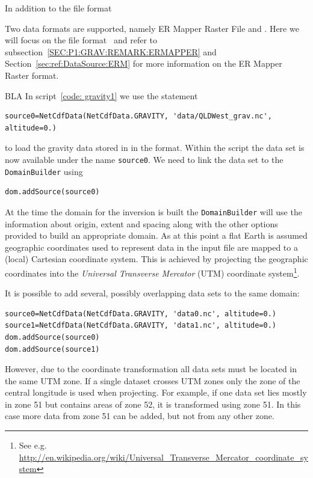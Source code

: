 
In addition to the \netcdf file format 


Two data formats are supported, namely ER Mapper Raster File and \netcdf.
Here we will focus on the \netcdf file format~\cite{NETCDF} and refer to
subsection~\ref{SEC:P1:GRAV:REMARK:ERMAPPER} and
Section~\ref{sec:ref:DataSource:ERM} for more information on the ER Mapper
Raster format.

BLA
In script~\ref{code: gravity1} we use the statement 
\begin{verbatim}
source0=NetCdfData(NetCdfData.GRAVITY, 'data/QLDWest_grav.nc', altitude=0.)
\end{verbatim}
  
to load the gravity data stored in  in the \netcdf format. 
Within the script the data set is now available under the name \verb|source0|.
We need to link the data set to the \verb|DomainBuilder| using 
\begin{verbatim}
dom.addSource(source0)
\end{verbatim}
At the time the domain for the inversion is built the \verb|DomainBuilder|
will use the information about origin, extent and spacing along with the other
options provided to build an appropriate domain.
As at this point a flat Earth is assumed geographic coordinates used to
represent data in the input file are mapped to a (local) Cartesian coordinate
system. This is achieved by projecting the geographic coordinates into the
\emph{Universal Transverse Mercator} (UTM) coordinate system\footnote{See e.g.
\url{http://en.wikipedia.org/wiki/Universal_Transverse_Mercator_coordinate_system}}.

It is possible to add several, possibly overlapping data sets to the same
domain:
\begin{verbatim}
source0=NetCdfData(NetCdfData.GRAVITY, 'data0.nc', altitude=0.)
source1=NetCdfData(NetCdfData.GRAVITY, 'data1.nc', altitude=0.)
dom.addSource(source0)
dom.addSource(source1)
\end{verbatim}
However, due to the coordinate transformation all data sets must be located in
the same UTM zone. If a single dataset crosses UTM zones only the zone of the
central longitude is used when projecting.
For example, if one data set lies mostly in zone 51 but contains areas of zone
52, it is transformed using zone 51.
In this case more data from zone 51 can be added, but not from any other zone.


